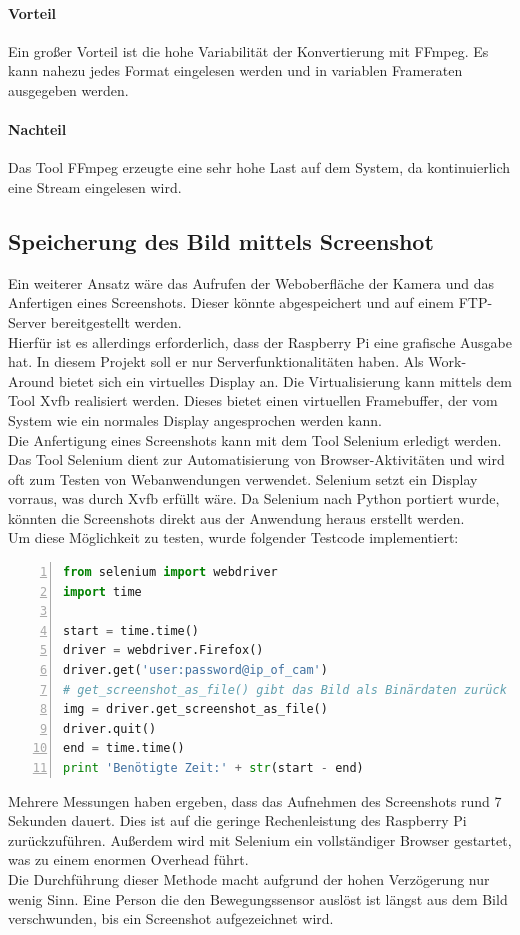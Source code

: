 \paragraph{Vorteil}
Ein großer Vorteil ist die hohe Variabilität der Konvertierung mit FFmpeg. Es kann nahezu jedes Format eingelesen werden und in variablen Frameraten ausgegeben werden. 
\paragraph{Nachteil}
Das Tool FFmpeg erzeugte eine sehr hohe Last auf dem System, da kontinuierlich eine Stream eingelesen wird. 

\subsection{Speicherung des Bild mittels Screenshot}

Ein weiterer Ansatz wäre das Aufrufen der Weboberfläche der Kamera und das Anfertigen eines Screenshots. Dieser könnte abgespeichert und auf einem FTP-Server bereitgestellt werden. \\
Hierfür ist es allerdings erforderlich, dass der Raspberry Pi eine grafische Ausgabe hat. In diesem Projekt soll er nur Serverfunktionalitäten haben. Als Work-Around bietet sich ein virtuelles Display an. Die Virtualisierung kann mittels dem Tool Xvfb\cite{xvfb} realisiert werden. Dieses bietet einen virtuellen Framebuffer, der vom System wie ein normales Display angesprochen werden kann. \\
Die Anfertigung eines Screenshots kann mit dem Tool Selenium\cite{selenium} erledigt werden. Das Tool Selenium dient zur Automatisierung von Browser-Aktivitäten und wird oft zum Testen von Webanwendungen verwendet. Selenium setzt ein Display vorraus, was durch Xvfb erfüllt wäre\cite{seleniumheadless}. Da Selenium nach Python portiert wurde, könnten die Screenshots direkt aus der Anwendung heraus erstellt werden. \\
Um diese Möglichkeit zu testen, wurde folgender Testcode implementiert:
\begin{lstlisting}[caption = Testcode - Aufnahme Screenshot mit Selenium, language=python, frame=single, breaklines=true,columns=fullflexible, commentstyle=\color{gray}\upshape, captionpos=b, numbers = left]
from selenium import webdriver
import time

start = time.time()
driver = webdriver.Firefox()
driver.get('user:password@ip_of_cam')
# get_screenshot_as_file() gibt das Bild als Binärdaten zurück
img = driver.get_screenshot_as_file()
driver.quit()
end = time.time()
print 'Benötigte Zeit:' + str(start - end)
\end{lstlisting}
Mehrere Messungen haben ergeben, dass das Aufnehmen des Screenshots rund 7 Sekunden dauert. Dies ist auf die geringe Rechenleistung des Raspberry Pi zurückzuführen. Außerdem wird mit Selenium ein vollständiger Browser gestartet, was zu einem enormen Overhead führt. \\
Die Durchführung dieser Methode macht aufgrund der hohen Verzögerung nur wenig Sinn. Eine Person die den Bewegungssensor auslöst ist längst aus dem Bild verschwunden, bis ein Screenshot aufgezeichnet wird.\\
